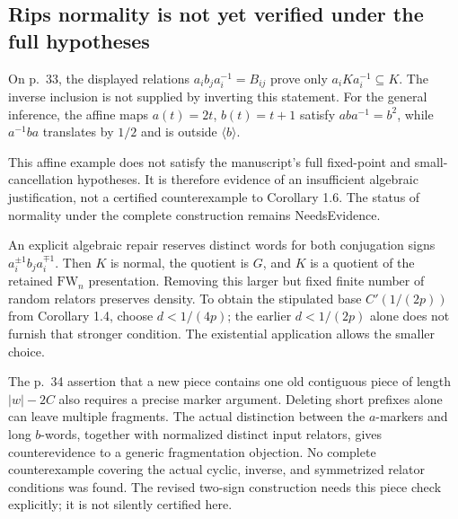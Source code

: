 \documentclass[10pt]{article}
\begin{document}
\subsection*{Rips normality is not yet verified under the full hypotheses}
On p. 33, the displayed relations \(a_i b_j a_i^{-1}=B_{ij}\) prove only \(a_iKa_i^{-1}\subseteq K\). The inverse inclusion is not supplied by inverting this statement. For the general inference, the affine maps \(a(t)=2t\), \(b(t)=t+1\) satisfy \(aba^{-1}=b^2\), while \(a^{-1}ba\) translates by \(1/2\) and is outside \(\langle b\rangle\).\par
This affine example does not satisfy the manuscript’s full fixed-point and small-cancellation hypotheses. It is therefore evidence of an insufficient algebraic justification, not a certified counterexample to Corollary 1.6. The status of normality under the complete construction remains NeedsEvidence.\par
An explicit algebraic repair reserves distinct words for both conjugation signs \(a_i^{\pm1}b_j a_i^{\mp1}\). Then \(K\) is normal, the quotient is \(G\), and \(K\) is a quotient of the retained \(\mathrm{FW}_n\) presentation. Removing this larger but fixed finite number of random relators preserves density. To obtain the stipulated base \(C'(1/(2p))\) from Corollary 1.4, choose \(d<1/(4p)\); the earlier \(d<1/(2p)\) alone does not furnish that stronger condition. The existential application allows the smaller choice.\par
The p. 34 assertion that a new piece contains one old contiguous piece of length \(|w|-2C\) also requires a precise marker argument. Deleting short prefixes alone can leave multiple fragments. The actual distinction between the \(a\)-markers and long \(b\)-words, together with normalized distinct input relators, gives counterevidence to a generic fragmentation objection. No complete counterexample covering the actual cyclic, inverse, and symmetrized relator conditions was found. The revised two-sign construction needs this piece check explicitly; it is not silently certified here.\par
\end{document}
